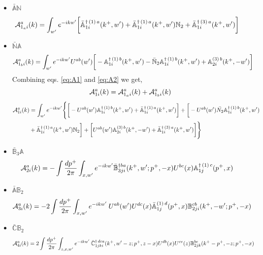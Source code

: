 \documentclass[10pt]{article}
\def\mf#1{\mathbb{#1}}
\numberwithin{equation}{section}
\begin{document}
\begin{itemize}
    \item $\bar{\mf{A}} \mf{N}$
\begin{align} \label{eq:A1}
    {\cal A}_{1_{a} i} ^{a} (k)
 & = \int_{w^{\prime}}e^{-ikw^{\prime}}\bigg[\bar{\mf{A}}^{\dagger\,(1)\,a}_{1i}(k^{+},w^{\prime})+\bar{\mf{A}}^{\dagger\,(1)\,a}_{1i}(k^{+},w^{\prime})\mf{N}_{2}+\bar{\mf{A}}^{\dagger\,(3)\,a}_{1i}(k^{+},w^{\prime})\bigg]
\end{align}
\item $\bar{\mf{N}} \mf{A}$
 \begin{align} \label{eq:A2}
    {\cal A}_{1_{b} i} ^{a} (k)
 & =  \int_{w^{\prime}}e^{-ikw^{\prime}} U^{ab}(w^{\prime})\bigg[-\mf{A}^{\dagger\, (1)\, b}_{1i}(k^{+},w^{\prime})-\bar{\mf{N}}_{2}\mf{A}^{\dagger\, (1)\, b}_{1i}(k^{+},w^{\prime})+\mf{A}^{(3)\, b}_{2i}(k^{+},-w^{\prime})\bigg]
 \end{align}
Combining eqs. \eqref{eq:A1} and \eqref{eq:A2} we get,
$$ {\cal A}^{a}_{1i}(k) = {\cal A}_{1_{a} i} ^{a} (k)+{\cal A}_{1_{b} i} ^{a} (k) $$
\begin{align}
        {\cal A}^{a}_{1i}(k) & = \int_{w^{\prime}} e^{-ikw^{\prime}}\Bigg\{\bigg[-U^{ab}(w^{\prime})\mf{A}^{\dagger\,(1)\, b}_{1i}(k^{+},w^{\prime})+\Bar{\mf{A}}^{\dagger\, (1)\, a}_{1i}(k^{+}, w^{\prime})\bigg]+\bigg[-U^{ab}(w^{\prime})\Bar{N_{2}}\mf{A}^{\dagger\,(1)\, b}_{1i} (k^{+},w^{\prime})\notag \\ & +\Bar{\mf{A}}^{\dagger\,(1)\, a}_{1i}(k^{+}, w^{\prime})\mf{N}_{2}\bigg] + \bigg[U^{ab}(w^{\prime})\mf{A}^{(3)\, b}_{2i}(k^{+},-w^{\prime})+\Bar{\mf{A}}^{\dagger\,(3)\, a}_{1i}(k^{+}, w^{\prime})\bigg]\Bigg\}
\end{align}
 \item $\bar{\mf{B}}_{3}\mf{A}$
\begin{align}
    {\cal A}_{2 i} ^{a} (k)
 & = - \int \frac{dp^{+}}{2\pi} \int_{x,w^{\prime}} e^{-ikw^{\prime}} \Bar{\mf{B}}^{\dagger ba}_{3ji}(k^{+},w^{\prime}; p^{+},-x) U^{bc}(x) \mf{A}^{\dagger\,(1)\, c}_{1j}(p^{+},x)
\end{align}
\item $\bar{{\mf{A}}} \mf{B}_{2}$
  \begin{align}
    {\cal A}_{3 i} ^{a} (k)
 & = -2 \int \frac{dp^{+}}{2\pi} \int_{x,w^{\prime}} e^{-i k w^\prime}  \:U^{ab}(w^\prime)U^{dc}(x) \bar{\mf{A}}^{(1)\, d}_{1j}(p^+,x) {\mf{B}}^{cb}_{2ji} (k^+,-w^\prime;p^+, -x) \:
\end{align}
\item $\bar{{\mf{C}}} \mf{B}_{2}$ 
     \begin{align}
        {\cal A}_{4 i} ^{a} (k) & =  2  \int 
 \frac{d p^+}{2\pi}  
 \int_{z, x, w^\prime} e^{-i k w^\prime}  \:
                \bar{\mf{C}}^{\dagger\, dca}_{1jki}(k^+,w^\prime-z; p^+, z-x)  
                 U^{db}(x)
                 U^{ce}(z) 
                {\mf{B}}^{be}_{2jk} (k^{+}-p^+, -z; p^+, -x)
    \end{align}
\end{itemize}
\end{document}
